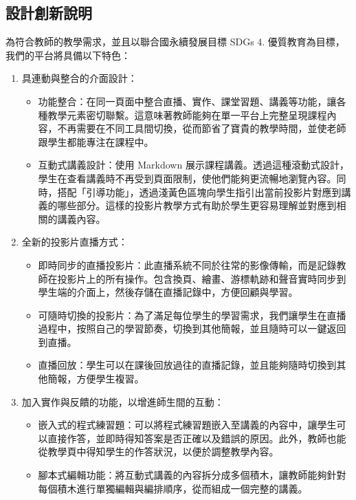 \documentclass[12pt]{article}
\begin{document}
\subsection{設計創新說明}
為符合教師的教學需求，並且以聯合國永續發展目標 SDGs 4. 優質教育為目標，我們的平台將具備以下特色：
\begin{enumerate}[label=(\arabic*)]
  \item 具連動與整合的介面設計：
  \begin{itemize}
    \item 功能整合：在同一頁面中整合直播、實作、課堂習題、講義等功能，讓各種教學元素密切聯繫。這意味著教師能夠在單一平台上完整呈現課程內容，不再需要在不同工具間切換，從而節省了寶貴的教學時間，並使老師跟學生都能專注在課程中。
    \item 互動式講義設計：使用 Markdown 展示課程講義。透過這種滾動式設計，學生在查看講義時不再受到頁面限制，使他們能夠更流暢地瀏覽內容。同時，搭配「引導功能」，透過淺黃色區塊向學生指引出當前投影片對應到講義的哪些部分。這樣的投影片教學方式有助於學生更容易理解並對應到相關的講義內容。
  \end{itemize}
  \item 全新的投影片直播方式：
  \begin{itemize}
    \item 即時同步的直播投影片：此直播系統不同於往常的影像傳輸，而是記錄教師在投影片上的所有操作。包含換頁、繪畫、游標軌跡和聲音實時同步到學生端的介面上，然後存儲在直播記錄中，方便回顧與學習。
    \item 可隨時切換的投影片：為了滿足每位學生的學習需求，我們讓學生在直播過程中，按照自己的學習節奏，切換到其他簡報，並且隨時可以一鍵返回到直播。
    \item 直播回放：學生可以在課後回放過往的直播記錄，並且能夠隨時切換到其他簡報，方便學生複習。
  \end{itemize}
  \item 加入實作與反饋的功能，以增進師生間的互動：
  \begin{itemize}
    \item 嵌入式的程式練習題：可以將程式練習題嵌入至講義的內容中，讓學生可以直接作答，並即時得知答案是否正確以及錯誤的原因。此外，教師也能從教學頁中得知學生的作答狀況，以便於調整教學內容。
    \item 腳本式編輯功能：將互動式講義的內容拆分成多個積木，讓教師能夠針對每個積木進行單獨編輯與編排順序，從而組成一個完整的講義。
  \end{itemize}
\end{enumerate}
\end{document}
